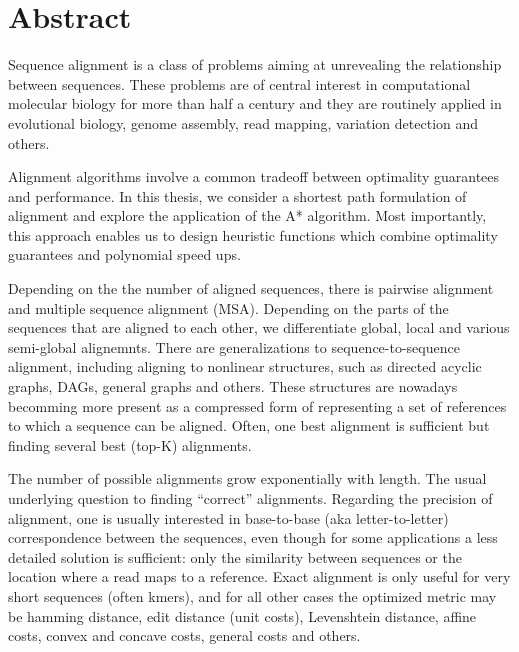 \begingroup
\let\clearpage\relax
\let\cleardoublepage\relax
\let\cleardoublepage\relax

\chapter*{Abstract}

Sequence alignment is a class of problems aiming at unrevealing the relationship
between sequences. These problems are of central interest in computational
molecular biology for more than half a century and they are routinely applied in
evolutional biology, genome assembly, read mapping, variation detection and
others.

Alignment algorithms involve a common tradeoff between optimality guarantees and
performance. In this thesis, we consider a shortest path formulation of
alignment and explore the application of the A* algorithm. Most importantly,
this approach enables us to design heuristic functions which combine optimality
guarantees and polynomial speed ups.

Depending on the the number of aligned sequences, there is pairwise alignment
and multiple sequence alignment (MSA). Depending on the parts of the sequences
that are aligned to each other, we differentiate global, local and various
semi-global alignemnts. There are generalizations to sequence-to-sequence
alignment, including aligning to nonlinear structures, such as directed acyclic
graphs, DAGs, general graphs and others. These structures are nowadays becomming
more present as a compressed form of representing a set of references to which a
sequence can be aligned. Often, one best alignment is sufficient but finding
several best (top-K) alignments.

The number of possible alignments grow exponentially with length. The usual
underlying question to finding ``correct'' alignments. Regarding the precision
of alignment, one is usually interested in base-to-base (aka letter-to-letter)
correspondence between the sequences, even though for some applications a less
detailed solution is sufficient: only the similarity between sequences or the
location where a read maps to a reference. Exact alignment is only useful for
very short sequences (often kmers), and for all other cases the optimized metric
may be hamming distance, edit distance (unit costs), Levenshtein distance,
affine costs, convex and concave costs, general costs and others. 

